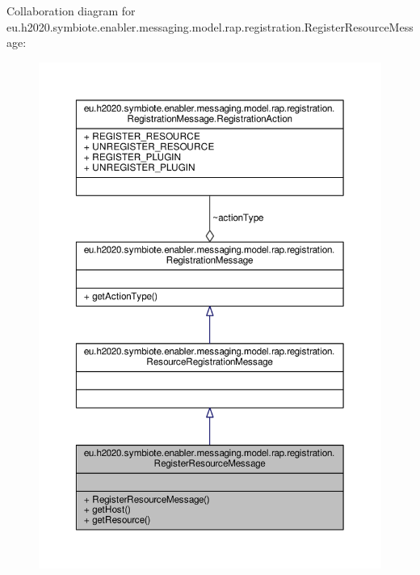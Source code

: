 Collaboration diagram for eu.\+h2020.\+symbiote.\+enabler.\+messaging.\+model.\+rap.\+registration.\+Register\+Resource\+Message\+:
\nopagebreak
\begin{figure}[H]
\begin{center}
\leavevmode
\includegraphics[width=350pt]{classeu_1_1h2020_1_1symbiote_1_1enabler_1_1messaging_1_1model_1_1rap_1_1registration_1_1RegisterResourceMessage__coll__graph}
\end{center}
\end{figure}
